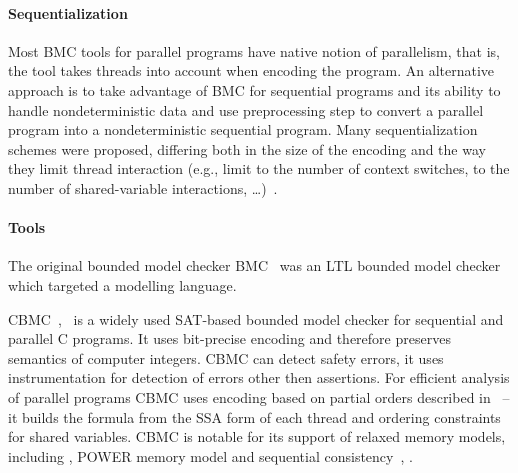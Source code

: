 \paragraph{Sequentialization}

Most BMC tools for parallel programs have native notion of parallelism, that
is, the tool takes threads into account when encoding the program.
An alternative approach is to take advantage of BMC for sequential programs and
its ability to handle nondeterministic data and use preprocessing step to
convert a parallel program into a nondeterministic sequential program.
Many sequentialization schemes were proposed, differing both in the size of the encoding and the way they limit thread interaction (e.g., limit to the number of context switches, to the number of shared-variable interactions, …)~\cite{Qadeer2004?,TODO...}.


\paragraph{Tools}

The original bounded model checker BMC~\cite{Biere1999} was an LTL bounded
model checker which targeted a modelling language.


CBMC~\cite{Clarke2004},~\cite{Kroening2014} is a widely used SAT-based bounded
model checker for sequential and parallel C programs.
It uses bit-precise encoding and therefore preserves semantics of computer
integers.
CBMC can detect safety errors, it uses instrumentation for detection of errors
other then assertions.
For efficient analysis of parallel programs CBMC uses encoding based on partial
orders described in~\cite{Alglave2013po} -- it builds the formula from the SSA
form of each thread and ordering constraints for shared variables.
CBMC is notable for its support of relaxed memory models, including \xtso,
POWER memory model and sequential consistency~\cite{Alglave2013po}, .


